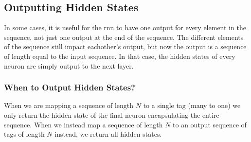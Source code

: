     \subsection{Outputting Hidden States \label{ssec: outputting hidden states}}
    In some cases, it is useful for the \gls{rnn} to have one output for every element in the sequence, not just one output at the end of the sequence. The different elements of the sequence still impact eachother's output, but now the output is a sequence of length equal to the input sequence. In that case, the hidden states of every neuron are simply output to the next layer\cite{mlTextbook}.  
    
    \subsubsection{When to Output Hidden States?}
    
    
    When we are mapping a sequence of length $N$ to a single tag (many to one) we only return the hidden state of the final \gls{neuron} encapsulating the entire sequence. When we instead map a sequence of length $N$ to an output sequence of tags of length $N$ instead, we return all hidden states.
    